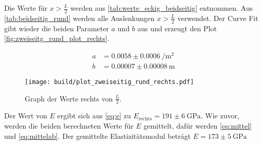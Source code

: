 Die Werte für $x > \frac{L}{2}$ werden aus \autoref{tab:werte_eckig_beidseitig} entnommen.
Aus \autoref{tab:beidseitig_rund} werden alle Auslenkungen $x > \frac{L}{2}$ verwendet.
Der Curve Fit gibt wieder die beiden Parameter $a$ und $b$ aus und erzeugt den Plot \autoref{fig:zweiseitg_rund_plot_rechts}.

\begin{align}
    a &= 0.0058 \pm \SI{0.0006}{\per \meter\squared} \\
    b &= 0.00007 \pm \SI{0.00008}{\meter}
\end{align}

\begin{figure}
    \centering
    \texttt{[image: build/plot\_zweiseitig\_rund\_rechts.pdf]}
    \caption{Graph der Werte rechts von $\frac{L}{2}$.}
    \label{fig:zweiseitg_rund_plot_rechts}
\end{figure}

Der Wert von $E$ ergibt sich aus \autoref{eq:e} zu $E_\text{rechts} = 191 \pm \SI{6}{\giga\pascal}$.
Wie zuvor, werden die beiden berechneten Werte für $E$ gemittelt, dafür werden \autoref{eq:mittel} und \autoref{eq:mittelab}. 
Der gemittelte Elastizitätsmodul beträgt $E = 173 \pm \SI{5}{\giga\pascal}$